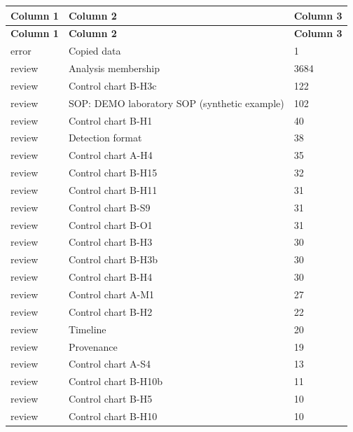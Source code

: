 {\footnotesize
\begin{longtable}{@{}lll@{}}
\toprule \textbf{Column 1} & \textbf{Column 2} & \textbf{Column 3} \\\midrule\endfirsthead
\toprule \textbf{Column 1} & \textbf{Column 2} & \textbf{Column 3} \\\midrule\endhead
error & Copied data & 1 \\\hline
review & Analysis membership & 3684 \\\hline
review & Control chart B-H3c & 122 \\\hline
review & SOP: DEMO laboratory SOP (synthetic example) & 102 \\\hline
review & Control chart B-H1 & 40 \\\hline
review & Detection format & 38 \\\hline
review & Control chart A-H4 & 35 \\\hline
review & Control chart B-H15 & 32 \\\hline
review & Control chart B-H11 & 31 \\\hline
review & Control chart B-S9 & 31 \\\hline
review & Control chart B-O1 & 31 \\\hline
review & Control chart B-H3 & 30 \\\hline
review & Control chart B-H3b & 30 \\\hline
review & Control chart B-H4 & 30 \\\hline
review & Control chart A-M1 & 27 \\\hline
review & Control chart B-H2 & 22 \\\hline
review & Timeline & 20 \\\hline
review & Provenance & 19 \\\hline
review & Control chart A-S4 & 13 \\\hline
review & Control chart B-H10b & 11 \\\hline
review & Control chart B-H5 & 10 \\\hline
review & Control chart B-H10 & 10 \\\hline
\bottomrule
\end{longtable}}

